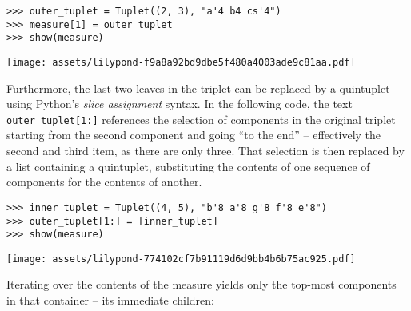 \begin{abjadbookoutput}
\begin{singlespacing}
\vspace{-0.5\baselineskip}
\begin{lstlisting}
>>> outer_tuplet = Tuplet((2, 3), "a'4 b4 cs'4")
>>> measure[1] = outer_tuplet
>>> show(measure)
\end{lstlisting}
\noindent\texttt{[image: assets/lilypond-f9a8a92bd9dbe5f480a4003ade9c81aa.pdf]}
\end{singlespacing}
\end{abjadbookoutput}

Furthermore, the last two leaves in the triplet can be replaced by a quintuplet
using Python's \emph{slice assignment} syntax. In the following code, the text
\texttt{outer_tuplet[1:]} references the selection of components in the
original triplet starting from the second component and going \enquote{to the
end} -- effectively the second and third item, as there are only three. That
selection is then replaced by a list containing a quintuplet, substituting the
contents of one sequence of components for the contents of another.

\begin{comment}
<abjad>
inner_tuplet = Tuplet((4, 5), "b'8 a'8 g'8 f'8 e'8")
outer_tuplet[1:] = [inner_tuplet]
show(measure)
</abjad>
\end{comment}

\begin{abjadbookoutput}
\begin{singlespacing}
\vspace{-0.5\baselineskip}
\begin{lstlisting}
>>> inner_tuplet = Tuplet((4, 5), "b'8 a'8 g'8 f'8 e'8")
>>> outer_tuplet[1:] = [inner_tuplet]
>>> show(measure)
\end{lstlisting}
\noindent\texttt{[image: assets/lilypond-774102cf7b91119d6d9bb4b6b75ac925.pdf]}
\end{singlespacing}
\end{abjadbookoutput}

\noindent Iterating over the contents of the  measure yields only
the top-most components in that container -- its immediate children:

\begin{comment}
<abjad>
for component in measure:
    component

</abjad>
\end{comment}

